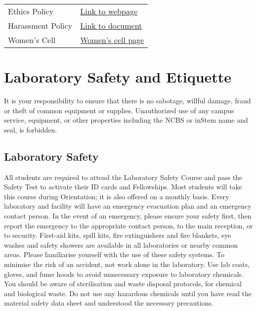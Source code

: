 \documentclass[a4paper,10pt]{article}
\begin{document}
\begin{tabular}{l l}
    Ethics Policy & \href{www.ncbs.res.in/ethics}{Link to webpage} \\
    Harassment Policy &
    \href{www.ncbs.res.in/sitefiles/CampusHarassmentPolicyDec2013.pdf}{Link to
    document} \\ 
    Women's Cell & \href{www.ncbs.res.in/women}{Women's cell page}
\end{tabular} \newline

\section{Laboratory Safety and Etiquette}
It is your responsibility to ensure that there is no sabotage, willful damage, fraud or theft of
common equipment or supplies. Unauthorized use of any campus service, equipment, or
other properties including the NCBS or inStem name and seal, is forbidden.

\subsection{Laboratory Safety}
All students are required to attend the Laboratory Safety Course and
pass the Safety Test to activate their ID cards and Fellowships. Most students will take this
course during Orientation; it is also offered on a monthly basis. Every laboratory and facility
will have an emergency evacuation plan and an emergency contact person. In the event of an
emergency, please ensure your safety first, then report the emergency to the appropriate
contact person, to the main reception, or to security. First-aid kits, spill kits, fire
extinguishers and fire blankets, eye washes and safety showers are available in all
laboratories or nearby common areas. Please familiarise yourself with the use of these safety
systems. To minimise the risk of an accident, not work alone in the laboratory. Use lab
coats, gloves, and fume hoods to avoid unnecessary exposure to laboratory chemicals. You
should be aware of sterilisation and waste disposal protocols, for chemical and biological
waste. Do not use any hazardous chemicals until you have read the material safety data sheet
and understood the necessary precautions.
\end{document}
